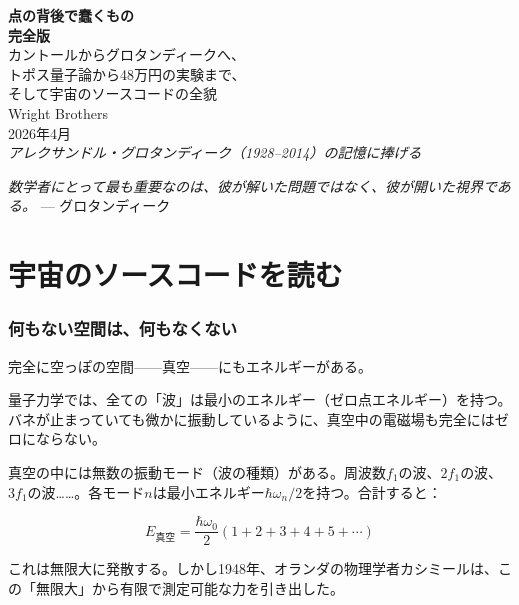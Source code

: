 \documentclass[12pt,a4paper]{article}
\begin{document}
\begin{center}
\vspace*{1cm}
{\Huge\bfseries 点の背後で蠢くもの}\\[0.5cm]
{\Large\bfseries 完全版}\\[0.8cm]
{\large カントールからグロタンディークへ、\\トポス量子論から48万円の実験まで、\\そして宇宙のソースコードの全貌}\\[2cm]
{\large Wright Brothers}\\[0.5cm]
{2026年4月}\\[2cm]
{\itshape アレクサンドル・グロタンディーク（1928--2014）の記憶に捧げる}
\end{center}

\newpage
\tableofcontents
\newpage

\begin{epigraph}
\textit{数学者にとって最も重要なのは、彼が解いた問題ではなく、彼が開いた視界である。}
\hfill --- グロタンディーク
\end{epigraph}

\vspace{0.5cm}

\part{宇宙のソースコードを読む}

\section{何もない空間は、何もなくない}

完全に空っぽの空間——真空——にもエネルギーがある。

量子力学では、全ての「波」は最小のエネルギー（ゼロ点エネルギー）を持つ。バネが止まっていても微かに振動しているように、真空中の電磁場も完全にはゼロにならない。

真空の中には無数の振動モード（波の種類）がある。周波数$f_1$の波、$2f_1$の波、$3f_1$の波……。各モード$n$は最小エネルギー$\hbar\omega_n/2$を持つ。合計すると：

$$E_{\text{真空}} = \frac{\hbar\omega_0}{2}(1 + 2 + 3 + 4 + 5 + \cdots)$$

これは無限大に発散する。しかし1948年、オランダの物理学者カシミールは、この「無限大」から有限で測定可能な力を引き出した。
\end{document}

